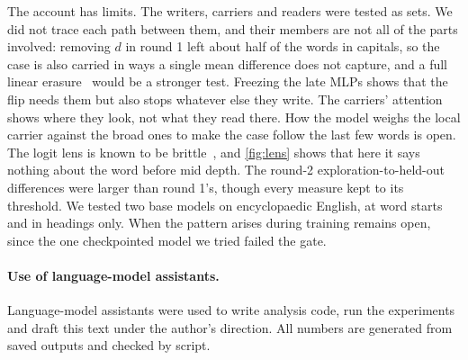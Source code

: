 \documentclass[11pt]{article}
\begin{document}
The account has limits. The writers, carriers and readers were tested as sets. We did not trace each path between them, and their members are not all of the parts involved: removing $d$ in round 1 left about half of the words in capitals, so the case is also carried in ways a single mean difference does not capture, and a full linear erasure~\citep{belrose2023leace} would be a stronger test. Freezing the late MLPs shows that the flip needs them but also stops whatever else they write. The carriers' attention shows where they look, not what they read there. How the model weighs the local carrier against the broad ones to make the case follow the last few words is open. The logit lens is known to be brittle~\citep{belrose2023tunedlens}, and \cref{fig:lens} shows that here it says nothing about the word before mid depth. The round-2 exploration-to-held-out differences were larger than round 1's, though every measure kept to its threshold. We tested two base models on encyclopaedic English, at word starts and in headings only. When the pattern arises during training remains open, since the one checkpointed model we tried failed the gate.

\paragraph{Use of language-model assistants.} Language-model assistants were used to write analysis code, run the experiments and draft this text under the author's direction. All numbers are generated from saved outputs and checked by script.



\end{document}
